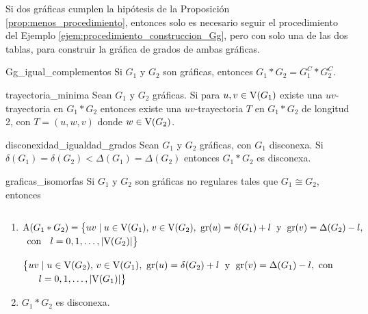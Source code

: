 \documentclass[fleqn, 11pt]{article}
\begin{document}
    Si dos gráficas cumplen la hipótesis de la Proposición \eqref{prop:menos_procedimiento}, entonces solo es necesario seguir el procedimiento del Ejemplo \eqref{ejem:procedimiento_construccion_Gg}, pero con solo una de las dos tablas, para construir la gráfica de grados de ambas gráficas.

    \begin{teorema}[beforeafter skip = 4mm]{}{Gg_igual_complementos}
        Si $ G_1 $ y $ G_2 $ son gráficas, entonces $ G_1 \ast G_2 = G_1^C \ast G_2^C $.
    \end{teorema}

    \begin{teorema}[beforeafter skip = 4mm]{}{trayectoria_minima}
        Sean $ G_1 $ y $ G_2 $ gráficas. Si para $ u,v \in \textnormal{V}(G_1) $ existe una $ uv $-trayectoria en $ G_1 \ast G_2 $ entonces existe una $ uv $-trayectoria $ T $ en $ G_1 \ast G_2 $ de longitud 2, con $ T = (u,w,v) $ donde $ w \in \textnormal{V}(G_2) $.
    \end{teorema}

    \begin{teorema}[beforeafter skip = 4mm]{}{disconexidad_igualdad_grados}
        Sean $ G_1 $ y $ G_2 $ gráficas, con $ G_1 $ disconexa. Si $ \delta(G_1) = \delta(G_2) < \Delta(G_1) = \Delta(G_2) $ entonces $ G_1 \ast G_2 $ es disconexa.
    \end{teorema}

    \begin{teorema}[beforeafter skip = 4mm]{}{graficas_isomorfas}
        Si $ G_1 $ y $ G_2 $ son gráficas no regulares tales que $ G_1 \cong G_2 $, entonces \vspace{3mm}

        \begin{tabular}{rl}
            
        \end{tabular}

        \begin{enumerate}
            \item $ \textnormal{A}(G_1 \ast G_2) = \left\{ uv \mid u \in \textnormal{V}(G_1), \, v \in \textnormal{V}(G_2), \textnormal{ gr}(u) = \delta(G_1) + l \phantom{|_i^i} \textnormal{y} \phantom{|_i^i} \textnormal{gr}(v) = \Delta(G_2) - l, \right. $
            $ \left. \textnormal{ con } \phantom{|_i^i} l = 0,1, \ldots, \lvert \textnormal{V}(G_2) \rvert \right\} $

            $ \left\{ uv \mid u \in \textnormal{V}(G_2), \, v \in \textnormal{V}(G_1), \textnormal{ gr}(u) = \delta(G_2) + l \phantom{|_i^i} \textnormal{y} \phantom{|_i^i} \textnormal{gr}(v) = \Delta(G_1) - l, \textnormal{ con } \right. $
            $ \left. \quad \phantom{|_i^i} l = 0,1, \ldots, \lvert \textnormal{V}(G_1) \rvert \right\} $
            
            \item $ G_1 \ast G_2 $ es disconexa.
        \end{enumerate}
    \end{teorema}
\end{document}
